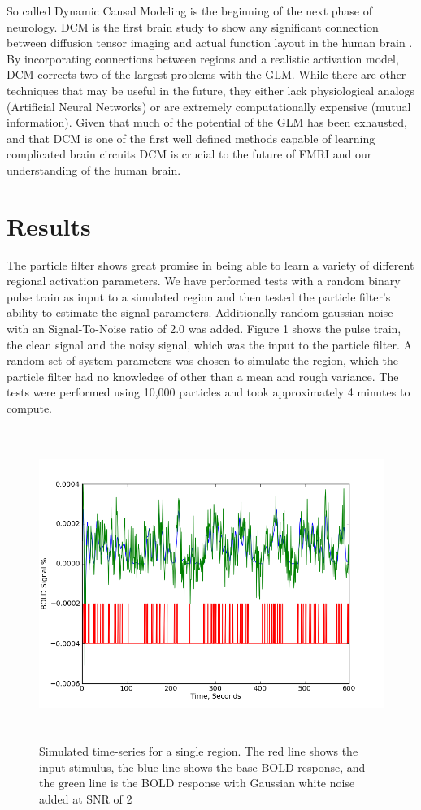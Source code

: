 \documentclass{article}
\begin{document}
So called Dynamic Causal Modeling is the beginning of 
the next phase of neurology. DCM is the first 
brain study to show any significant connection between 
diffusion tensor imaging and actual function layout in
the human brain \cite{dti_dcm}. By incorporating connections
between regions and a realistic activation model, DCM
corrects two of the largest problems with the GLM. While
there are other techniques that may be useful in the future,
they either lack physiological analogs (Artificial Neural
Networks) or are extremely computationally expensive 
(mutual information).  Given that much of the 
potential of the GLM has been exhausted, and that DCM 
is one of the first well defined methods capable of learning 
complicated brain circuits DCM is crucial to the future
of FMRI and our understanding of the human brain.

\section*{Results}
The particle filter shows great promise in being able 
to learn a variety of different regional activation
parameters. We have performed tests with a random binary
pulse train as input to a simulated region and then tested
the particle filter's ability to estimate the signal
parameters. Additionally random gaussian noise with an
Signal-To-Noise ratio of 2.0 was added. Figure 1 shows
the pulse train, the clean signal and the noisy signal, which
was the input to the particle filter. A random set of 
system parameters was chosen to simulate the region,
which the particle filter had no knowledge of other than
a mean and rough variance.
The tests were performed using 10,000 particles and took
approximately 4 minutes to compute.

\begin{figure}
\includegraphics[width=8in,height=4in]{noise.png}
\caption{Simulated time-series for a single region. The red line
shows the input stimulus, the blue line shows the base BOLD 
response, and the green line is the BOLD response with Gaussian
white noise added at SNR of 2}
\label{fig:noise}
\end{figure}
\end{document}

